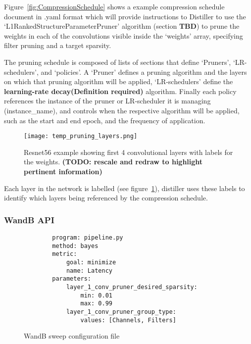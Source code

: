 \documentclass[../Dissertation.tex]{subfiles}
\begin{document}
Figure~\ref{fig:CompressionSchedule} shows a example compression schedule document in .yaml format which will provide instructions to Distiller to use the `L1RankedStructureParameterPruner' algorithm (section \textbf{TBD}) to prune the weights in each of the convolutions visible inside the `weights' array, specifying filter pruning and a target sparsity.

The pruning schedule is composed of lists of sections that define `Pruners', `LR-schedulers', and `policies'. A `Pruner' defines a pruning algorithm and the layers on which that pruning algorithm will be applied, `LR-schedulers' define the \textbf{learning-rate decay(Definition required)} algorithm. 
Finally each policy references the instance of the pruner or LR-scheduler it is managing (instance\_name), and controls when the respective algorithm will be applied, such as the start and end epoch, and the frequency of application.

\begin{figure}[H]
    \texttt{[image: temp\_pruning\_layers.png]}
    \caption{Resnet56 example showing first 4 convolutional layers with labels for the weights. \textbf{(TODO: rescale and redraw to highlight pertinent information)}}
    \label{fig:resnet56weightlabels}
\end{figure}

Each layer in the network is labelled (see figure~\ref{fig:resnet56weightlabels}), distiller uses these labels to identify which layers being referenced by the compression schedule. 


\newpage
\subsubsection{WandB API}

\singlespacing
\begin{figure}[H]
    \begin{verbatim}
        program: pipeline.py
        method: bayes
        metric:
            goal: minimize
            name: Latency
        parameters:
            layer_1_conv_pruner_desired_sparsity:
                min: 0.01
                max: 0.99
            layer_1_conv_pruner_group_type:
                values: [Channels, Filters]
    \end{verbatim}
    \caption{WandB sweep configuration file}
    \label{fig:sweepConfig}
\end{figure}
\doublespacing
\end{document}
